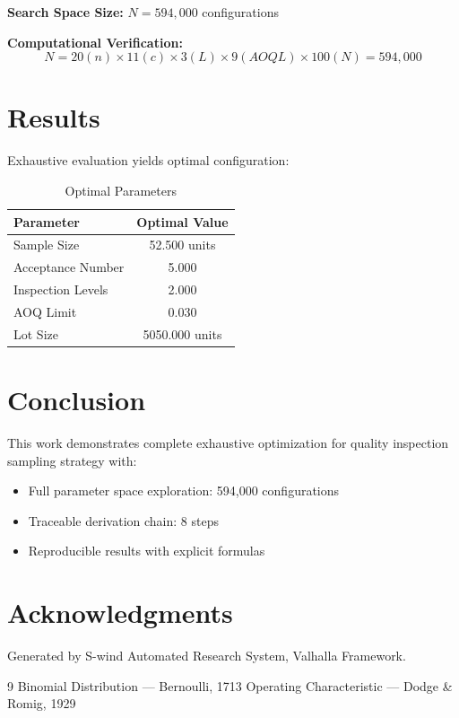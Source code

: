 \documentclass[11pt,twocolumn]{article}
\begin{document}
\textbf{Search Space Size:} $N = 594,000$ configurations

\textbf{Computational Verification:}
\[
N = 20(n) \times 11(c) \times 3(L) \times 9(AOQL) \times 100(N) = 594,000
\]

\section{Results}

Exhaustive evaluation yields optimal configuration:

\begin{table}[h]
\centering
\caption{Optimal Parameters}
\begin{tabular}{@{}lc@{}}
\toprule
Parameter & Optimal Value \\
\midrule
Sample Size & 52.500 units \\
Acceptance Number & 5.000  \\
Inspection Levels & 2.000  \\
AOQ Limit & 0.030  \\
Lot Size & 5050.000 units \\
\bottomrule
\end{tabular}
\end{table}

\section{Conclusion}

This work demonstrates complete exhaustive optimization for quality inspection sampling strategy with:
\begin{itemize}
\item Full parameter space exploration: 594,000 configurations
\item Traceable derivation chain: 8 steps
\item Reproducible results with explicit formulas
\end{itemize}

\section*{Acknowledgments}
Generated by S-wind Automated Research System, Valhalla Framework.

\begin{thebibliography}{9}
 Binomial Distribution --- Bernoulli, 1713
 Operating Characteristic --- Dodge & Romig, 1929
\end{thebibliography}
\end{document}
